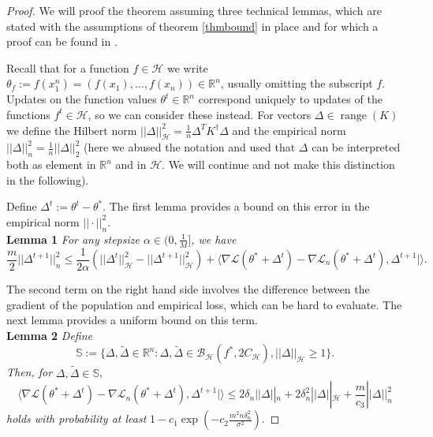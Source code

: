 \begin{proof}
We will proof the theorem assuming three technical lemmas, which are stated with the assumptions of theorem \ref{thmbound} in place and for which a proof can be found in \cite{wain17ada}.

Recall that for a function $f\in \mathcal{H}$ we write $\theta_f := f(x_1^n) = (f(x_1),\dots,f(x_n))\in \mathbb{R}^n$, usually omitting the subscript $f$. Updates on the function values $\theta^t\in \mathbb{R}^n$ correspond uniquely to updates of the functions $f^t\in\mathcal{H}$, so we can consider these instead. For vectors $\Delta\in \operatorname{range}(K)$ we define the Hilbert norm $||\Delta||_{\mathcal{H}}^2 = \frac{1}{n}\Delta^TK^{\dagger}\Delta$ and the empirical norm $||\Delta||_n^2 = \frac{1}{n}||\Delta||_2^2$ (here we abused the notation and used that $\Delta$ can be interpreted both as element in $\mathbb{R}^n$ and in $\mathcal{H}$. We will continue and not make this distinction in the following).

Define $\Delta^t := \theta^t-\theta^*$. The first lemma provides a bound on this error in the empirical norm $||\cdot||_n^2$.\\
\textbf{Lemma 1}
\textit{For any stepsize $\alpha\in(0,\frac{1}{M}]$, we have}
\begin{equation}
\label{lemma1eq}
\frac{m}{2}||\Delta^{t+1}||_n^2\le \frac{1}{2\alpha}(||\Delta^t||_{\mathcal{H}}^2 - ||\Delta^{t+1}||_{\mathcal{H}}^2) + \langle\nabla\mathcal{L}(\theta^*+\Delta^t) - \nabla\mathcal{L}_n(\theta^*+\Delta^t), \Delta^{t+1}|\rangle.
\end{equation}

The second term on the right hand side involves the difference between the gradient of the population and empirical loss, which can be hard to evaluate. The next lemma provides a uniform bound on this term. \\
\textbf{Lemma 2}
\textit{Define}
\begin{equation*}
\mathbb{S} := \{\Delta, \tilde{\Delta}\in \mathbb{R}^n: \Delta,\tilde{\Delta}\in \mathcal{B}_{\mathcal{H}}(f^*,2C_{\mathcal{H}}), ||\Delta||_{\mathcal{H}} \geq 1 \}.
\end{equation*}
\textit{Then, for} $\Delta, \tilde{\Delta} \in \mathbb{S}$,
\begin{equation}
\label{lemma2eq}
\langle\nabla\mathcal{L}(\theta^*+\Delta^t) - \nabla\mathcal{L}_n(\theta^*+\Delta^t), \Delta^{t+1}|\rangle \le 2\delta_n||\Delta||_n + 2\delta_n^2||\Delta||_{\mathcal{H}} + \frac{m}{c_3}||\Delta||_n^2
\end{equation}
\textit{holds with probability at least} $1-c_1\exp(-c_2\frac{m^2n\delta_n^2}{\sigma^2})$.


\end{proof}
